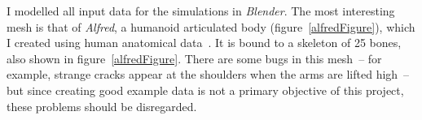 I modelled all input data for the simulations in \textsl{Blender}. The most interesting mesh
is that of \emph{Alfred}, a humanoid articulated body (figure~\ref{alfredFigure}), which I created
using human anatomical data~\cite{Anatomy:03}. It is bound to a skeleton of 25 bones, also shown
in figure~\ref{alfredFigure}. There are some bugs in this mesh~-- for example, strange cracks
appear at the shoulders when the arms are lifted high~-- but since creating good example data
is not a primary objective of this project, these problems should be disregarded.
